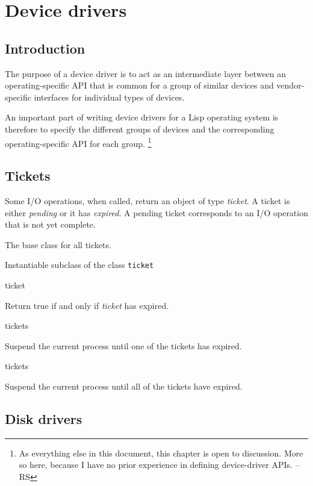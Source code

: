\chapter{Device drivers}

\section{Introduction}

The purpose of a device driver is to act as an intermediate layer
between an operating-specific API that is common for a group of
similar devices and vendor-specific interfaces for individual types of
devices. 

An important part of writing device drivers for a Lisp operating
system is therefore to specify the different groups of devices and the
corresponding operating-specific API for each group.%
\footnote{As everything else in this document, this chapter is open to
  discussion.  More so here, because I have no prior experience in
  defining device-driver APIs. -- RS}

\section{Tickets}

Some I/O operations, when called, return an object of type
\emph{ticket}.  A ticket is either \emph{pending} or it has
\emph{expired}.  A pending ticket corresponds to an I/O operation that
is not yet complete.  


The base class for all tickets.


Instantiable subclass of the class \texttt{ticket}

 {ticket}

Return true if and only if \textit{ticket} has expired.

 {\rest tickets}

Suspend the current process until one of the tickets has expired. 

 {\rest tickets}

Suspend the current process until all of the tickets have expired.

\section{Disk drivers}

